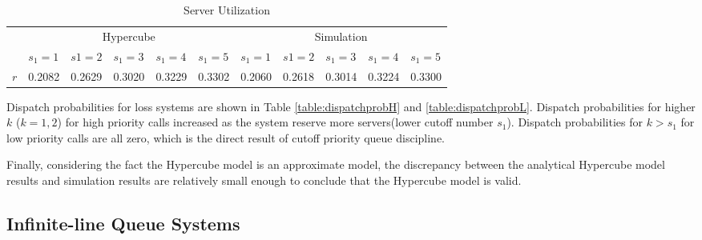 \documentclass{article}
\begin{document}
\begin{table}
\vspace{10mm}

\centering
\begin{tabular}{| l || l l l l l | l l l l l |}
\hline
& \multicolumn{5}{c|}{Hypercube} & \multicolumn{5}{c|}{Simulation}\\
& $s_1=1$ & $ s1= 2$ & $s_1=3$ & $s_1=4$ & $s_1=5$& $s_1=1$ & $ s1= 2$ & $s_1=3$ & $s_1=4$ & $s_1=5$  \\ 
\hline
$r$   &0.2082&0.2629&0.3020&0.3229&0.3302&0.2060&0.2618&0.3014&0.3224&0.3300  \\
\hline
\end{tabular}
\label{table:queueetc}
\caption{Server Utilization}

\end{table}

Dispatch probabilities for loss systems are shown in Table \ref{table:dispatchprobH} and \ref{table:dispatchprobL}. Dispatch probabilities for higher $k$ ($k=1,2$) for high priority calls increased as the system reserve more servers(lower cutoff number $s_1$). Dispatch probabilities for $k>s_1$ for low priority calls are all zero, which is the direct result of cutoff priority queue discipline.


Finally, considering the fact the Hypercube model is an approximate model, the discrepancy between the analytical Hypercube model results and simulation results are relatively small enough to conclude that the Hypercube model is valid.




\subsection{Infinite-line Queue Systems}
\end{document}
